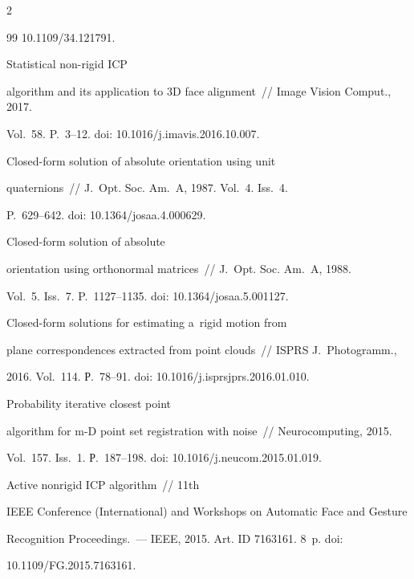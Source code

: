 \begin{multicols}{2}
{{\begin{thebibliography}{99}
10.1109/34.121791.


 Statistical non-rigid ICP 

algorithm and its application to 3D face alignment~// Image Vision Comput., 2017. 

Vol.~58. P.~3--12. doi: 10.1016/j.imavis.2016.10.007.


 Closed-form solution of absolute orientation using unit 

quaternions~// J.~Opt. Soc. Am.~A, 1987. Vol.~4. Iss.~4.  

P.~629--642. doi: 10.1364/josaa.4.000629.


 Closed-form solution of absolute 

orientation using orthonormal matrices~// J.~Opt. Soc. Am.~A, 1988. 

Vol.~5. Iss.~7. P.~1127--1135. doi: 10.1364/josaa.5.001127.


 Closed-form solutions for estimating a~rigid motion from 

plane correspondences extracted from point clouds~// ISPRS J.~Photogramm., 

2016. Vol.~114. Р.~78--91. doi: 10.1016/j.isprsjprs.2016.01.010.


 Probability iterative closest point 

algorithm for m-D point set registration with noise~// Neurocomputing, 2015. 

Vol.~157. Iss.~1. Р.~187--198. doi: 10.1016/j.neucom.2015.01.019.


 Active nonrigid ICP algorithm~// 11th 

IEEE Conference (International) and Workshops on Automatic Face and Gesture 

Recognition Proceedings.~--- IEEE, 2015. Art. ID 7163161. 8~p. doi: 

10.1109/FG.2015.7163161.




\end{thebibliography}}}
\end{multicols}
